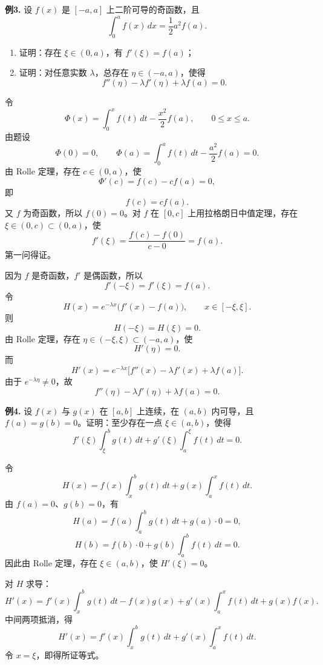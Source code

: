 \begin{problemblock}
\textbf{例3.} 设 \(f(x)\) 是 \([-a,a]\) 上二阶可导的奇函数，且
\[
\int_0^a f(x)\,dx=\frac12a^2f(a).
\]
\begin{enumerate}[label=(\Roman*), leftmargin=2.2em]
\item 证明：存在 \(\xi\in(0,a)\)，有 \(f'(\xi)=f(a)\)；
\item 证明：对任意实数 \(\lambda\)，总存在 \(\eta\in(-a,a)\)，使得
\[
f''(\eta)-\lambda f'(\eta)+\lambda f(a)=0.
\]
\end{enumerate}
\end{problemblock}
\begin{solutionblock}
令
\[
\Phi(x)=\int_0^x f(t)\,dt-\frac{x^2}{2}f(a),\qquad 0\le x\le a.
\]
由题设
\[
\Phi(0)=0,\qquad \Phi(a)=\int_0^a f(t)\,dt-\frac{a^2}{2}f(a)=0.
\]
由 Rolle 定理，存在 \(c\in(0,a)\)，使
\[
\Phi'(c)=f(c)-cf(a)=0,
\]
即
\[
f(c)=cf(a).
\]
又 \(f\) 为奇函数，所以 \(f(0)=0\)。对 \(f\) 在 \([0,c]\) 上用拉格朗日中值定理，存在 \(\xi\in(0,c)\subset(0,a)\)，使
\[
f'(\xi)=\frac{f(c)-f(0)}{c-0}=f(a).
\]
第一问得证。

因为 \(f\) 是奇函数，\(f'\) 是偶函数，所以
\[
f'(-\xi)=f'(\xi)=f(a).
\]
令
\[
H(x)=e^{-\lambda x}\bigl(f'(x)-f(a)\bigr),\qquad x\in[-\xi,\xi].
\]
则
\[
H(-\xi)=H(\xi)=0.
\]
由 Rolle 定理，存在 \(\eta\in(-\xi,\xi)\subset(-a,a)\)，使
\[
H'(\eta)=0.
\]
而
\[
H'(x)=e^{-\lambda x}\bigl[f''(x)-\lambda f'(x)+\lambda f(a)\bigr].
\]
由于 \(e^{-\lambda\eta}\ne0\)，故
\[
f''(\eta)-\lambda f'(\eta)+\lambda f(a)=0.
\]
\end{solutionblock}

\begin{problemblock}
\textbf{例4.} 设 \(f(x)\) 与 \(g(x)\) 在 \([a,b]\) 上连续，在 \((a,b)\) 内可导，且 \(f(a)=g(b)=0\)。证明：至少存在一点 \(\xi\in(a,b)\)，使得
\[
f'(\xi)\int_{\xi}^{b}g(t)\,dt
+g'(\xi)\int_a^{\xi}f(t)\,dt=0.
\]
\end{problemblock}
\begin{solutionblock}
令
\[
H(x)=f(x)\int_x^b g(t)\,dt+g(x)\int_a^x f(t)\,dt.
\]
由 \(f(a)=0\)、\(g(b)=0\)，有
\[
H(a)=f(a)\int_a^b g(t)\,dt+g(a)\cdot0=0,
\]
\[
H(b)=f(b)\cdot0+g(b)\int_a^b f(t)\,dt=0.
\]
因此由 Rolle 定理，存在 \(\xi\in(a,b)\)，使 \(H'(\xi)=0\)。

对 \(H\) 求导：
\[
H'(x)=f'(x)\int_x^b g(t)\,dt-f(x)g(x)
+g'(x)\int_a^x f(t)\,dt+g(x)f(x).
\]
中间两项抵消，得
\[
H'(x)=f'(x)\int_x^b g(t)\,dt
+g'(x)\int_a^x f(t)\,dt.
\]
令 \(x=\xi\)，即得所证等式。
\end{solutionblock}

